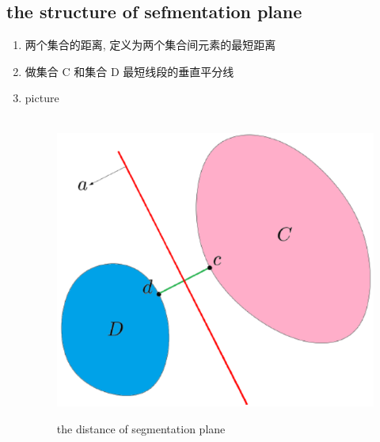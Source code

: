\documentclass[oneside, 12pt]{ctexbook}
\begin{document}
			\subsection{\quad the structure of sefmentation plane}
				\begin{enumerate}
					\item 两个集合的距离, 定义为两个集合间元素的最短距离
					
					\item 做集合 C 和集合 D 最短线段的垂直平分线
					
					\item picture
						\begin{figure}[H]
							\vspace{-0.2cm}  %
							\setlength{\abovecaptionskip}{-0.2cm}   %
							\centering
							\includegraphics[scale=0.5]{the_distance_of_segmentation.png}
							\renewcommand{\figurename}{Fig} %
							\caption{the distance of segmentation plane}
							\label{fig:4}
						\end{figure}
				\end{enumerate}
			
\end{document}
